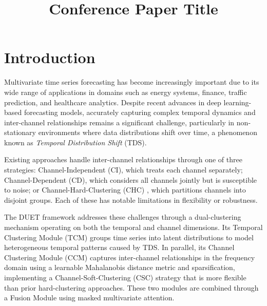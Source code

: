 \documentclass[conference]{IEEEtran}
\begin{document}
\title{Conference Paper Title\\}

\author{
\and
{}
\and
{}
}

\maketitle

\section{Introduction}
Multivariate time series forecasting has become increasingly important due to its wide range of applications in domains such as energy systems, finance, traffic prediction, and healthcare analytics. Despite recent advances in deep learning-based forecasting models, accurately capturing complex temporal dynamics and inter-channel relationships remains a significant challenge, particularly in non-stationary environments where data distributions shift over time, a phenomenon known as \textit{Temporal Distribution Shift} (TDS). 

Existing approaches handle inter-channel relationships through one of three strategies: Channel-Independent (CI), which treats each channel separately; Channel-Dependent (CD), which considers all channels jointly but is susceptible to noise; or Channel-Hard-Clustering (CHC) \cite{DGCformer}, which partitions channels into disjoint groups. Each of these has notable limitations in flexibility or robustness.

The DUET framework addresses these challenges through a dual-clustering mechanism operating on both the temporal and channel dimensions. Its Temporal Clustering Module (TCM) groups time series into latent distributions to model heterogeneous temporal patterns caused by TDS. In parallel, its Channel Clustering Module (CCM) captures inter-channel relationships in the frequency domain using a learnable Mahalanobis distance metric and sparsification, implementing a Channel-Soft-Clustering (CSC) strategy that is more flexible than prior hard-clustering approaches. These two modules are combined through a Fusion Module using masked multivariate attention.
\end{document}
